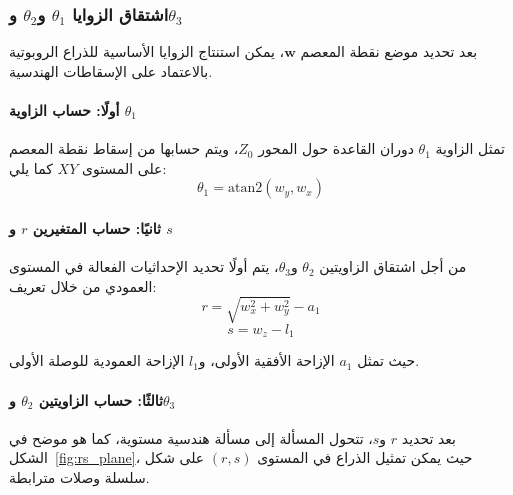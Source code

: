 \subsubsection{اشتقاق الزوايا $\theta_1$ و$\theta_2$ و$\theta_3$}

بعد تحديد موضع نقطة المعصم $\mathbf{w}$، يمكن استنتاج الزوايا الأساسية للذراع الروبوتية بالاعتماد على الإسقاطات الهندسية.

\paragraph{أولًا: حساب الزاوية $\theta_1$}

تمثل الزاوية $\theta_1$ دوران القاعدة حول المحور $Z_0$، ويتم حسابها من إسقاط نقطة المعصم على المستوى $XY$ كما يلي:
\[
\theta_1 = \mathrm{atan2}(w_y, w_x)
\]

\paragraph{ثانيًا: حساب المتغيرين $r$ و $s$}

من أجل اشتقاق الزاويتين $\theta_2$ و$\theta_3$، يتم أولًا تحديد الإحداثيات الفعالة في المستوى العمودي من خلال تعريف:
\[
r = \sqrt{w_x^2 + w_y^2} - a_1
\]
\[
s = w_z - l_1
\]

حيث تمثل $a_1$ الإزاحة الأفقية الأولى، و$l_1$ الإزاحة العمودية للوصلة الأولى.

\paragraph{ثالثًا: حساب الزاويتين $\theta_2$ و$\theta_3$}

بعد تحديد $r$ و$s$، تتحول المسألة إلى مسألة هندسية مستوية، كما هو موضح في الشكل~\ref{fig:rs_plane}، حيث يمكن تمثيل الذراع في المستوى $(r,s)$ على شكل سلسلة وصلات مترابطة.

